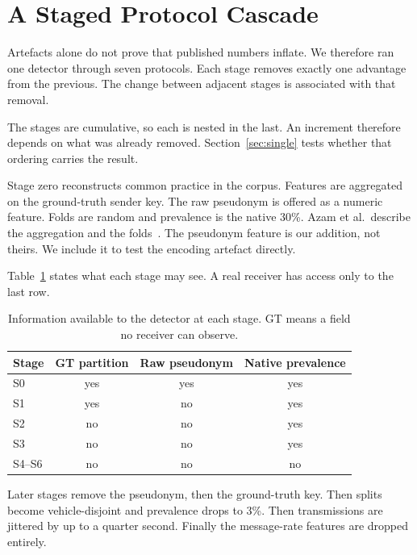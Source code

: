 \documentclass[conference]{IEEEtran}
\begin{document}
\section{A Staged Protocol Cascade}
\label{sec:cascade}

Artefacts alone do not prove that published numbers inflate.
We therefore ran one detector through seven protocols.
Each stage removes exactly one advantage from the previous.
The change between adjacent stages is associated with that removal.

The stages are cumulative, so each is nested in the last.
An increment therefore depends on what was already removed.
Section~\ref{sec:single} tests whether that ordering carries the result.

Stage zero reconstructs common practice in the corpus.
Features are aggregated on the ground-truth sender key.
The raw pseudonym is offered as a numeric feature.
Folds are random and prevalence is the native 30\%.
Azam et al.\ describe the aggregation and the folds~\cite{azam2022}.
The pseudonym feature is our addition, not theirs.
We include it to test the encoding artefact directly.

Table~\ref{tab:observable} states what each stage may see.
A real receiver has access only to the last row.

\begin{table}[t]
\caption{Information available to the detector at each stage.
GT means a field no receiver can observe.}
\label{tab:observable}
\centering
\footnotesize
\begin{tabular}{@{}lccc@{}}
\toprule
Stage & GT partition & Raw pseudonym & Native prevalence \\
\midrule
S0 & yes & yes & yes \\
S1 & yes & no & yes \\
S2 & no & no & yes \\
S3 & no & no & yes \\
S4--S6 & no & no & no \\
\bottomrule
\end{tabular}
\end{table}

Later stages remove the pseudonym, then the ground-truth key.
Then splits become vehicle-disjoint and prevalence drops to 3\%.
Then transmissions are jittered by up to a quarter second.
Finally the message-rate features are dropped entirely.


\end{document}
